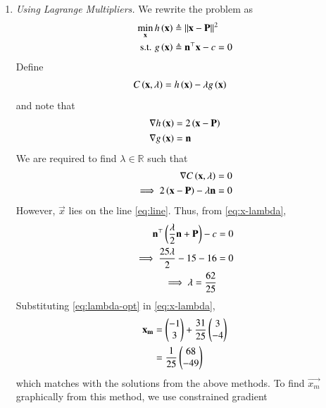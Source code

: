 \documentclass[journal,12pt,twocolumn]{IEEEtran}
\begin{document}
\begin{enumerate}
\begin{enumerate}
        \item \textit{Using Lagrange Multipliers.} We rewrite the problem as
        \begin{align}
            \min_{\mathbf{x}} h\left(\mathbf{x}\right) &\triangleq \left\lVert\mathbf{x}-\mathbf{P}\right\rVert^2 \\
            \textrm{s.t. } g\left(\mathbf{x}\right) &\triangleq \mathbf{n}^\top\mathbf{x} - c = 0
            \label{eq:lag-opt}
        \end{align}
        Define
        \begin{align}
            C\left(\mathbf{x},\lambda\right) &= h\left(\mathbf{x}\right) - \lambda g\left(\mathbf{x}\right)
            \label{eq:C-def}
        \end{align}
        and note that
        \begin{align}
            \nabla h\left(\mathbf{x}\right) &= 2\left(\mathbf{x}-\mathbf{P}\right) \\
            \nabla g\left(\mathbf{x}\right) &= \mathbf{n}
            \label{eq:diff-gh}
        \end{align}
        We are required to find $\lambda \in \mathbb{R}$ such that
        \begin{align}
            \nabla C\left(\mathbf{x},\lambda\right) &= 0 \\
            \implies 2\left(\mathbf{x}-\mathbf{P}\right) - \lambda\mathbf{n} &= 0
            \label{eq:x-lambda}
        \end{align}
        However, $\vec{x}$ lies on the line \eqref{eq:line}. Thus, from
        \eqref{eq:x-lambda},
        \begin{align}
            \mathbf{n}^\top\left(\frac{\lambda}{2}\mathbf{n}+\mathbf{P}\right) - c &= 0 \\
            \implies \frac{25\lambda}{2} - 15 - 16 &= 0 \\
            \implies \lambda = \frac{62}{25}
            \label{eq:lambda-opt}
        \end{align}
        Substituting \eqref{eq:lambda-opt} in \eqref{eq:x-lambda},
        \begin{align}
            \mathbf{x_m} &= \begin{pmatrix}-1\\3\end{pmatrix} + \frac{31}{25}\begin{pmatrix}3\\-4\end{pmatrix} \\
                    &= \frac{1}{25}\begin{pmatrix}68\\-49\end{pmatrix}
                    \label{eq:x-sol-lag}
        \end{align}
        which matches with the solutions from the above methods. To find
        $\vec{x_m}$ graphically from this method, we use constrained gradient 

\end{enumerate}
\end{enumerate}
\end{document}
